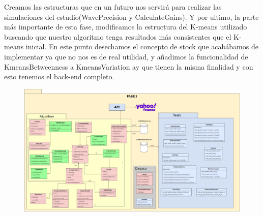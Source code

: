 \documentclass[12pt,a4paper]{article}
\begin{document}
	Creamos las estructuras que en un futuro nos servirá para realizar las simulaciones del estudio(WavePrecision y CalculateGains). Y por ultimo, la parte más importante de esta fase, modificamos la estructura del K-means utilizado buscando que nuestro algoritmo tenga resultados más consistentes que el K-means inicial. En este punto desechamos el concepto de stock que acabábamos de implementar ya que no nos es de real utilidad, y añadimos la funcionalidad de KmeansBetweenness a KmeansVariation ay que tienen la misma finalidad y con esto tenemos el back-end completo.\\
\begin{figure}[H]
\centering
  \centering
  \includegraphics[width=1\linewidth]{fase 2 full}
\label{fig:subrgrafo}
\end{figure}
\end{document}
